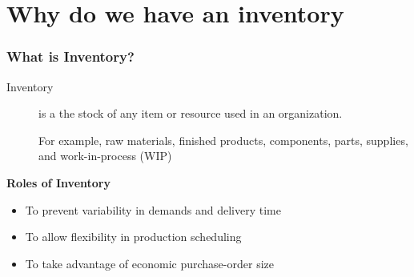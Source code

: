 \documentclass[10pt,handout,notes=show]{beamer}
\begin{document}
\section[Intro]{Why do we have an inventory}
\begin{frame}
  \frametitle{What is Inventory?}
  \begin{description}
      \item[Inventory] is a the stock of any \alert{item} or \alert{resource used} in an organization.
      \item[] For example, raw materials, finished products, components, parts, supplies, and work-in-process (WIP)
  \end{description}

  \NextLine
  \textbf{Roles of Inventory}
  \begin{itemize}
      \item To prevent \alert{variability} in \alert{demands} and \alert{delivery time}
      \item To allow \alert{flexibility in production} scheduling
      \item To take advantage of \alert{economic purchase-order} size
  \end{itemize}


\end{frame}
\end{document}
